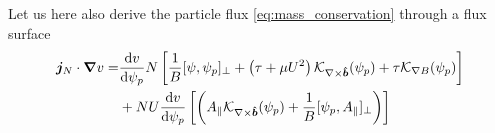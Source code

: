 Let us here also derive the particle flux \eqref{eq:mass_conservation} through a flux surface
\begin{align} \label{eq:particle_flux}
 \vec j_{N}\cdot \vec \nabla v %
 =&
  \frac{\d v}{\d \psi_p} N\left[\frac{1}{B}[\psi, \psi_p]_\perp + \left(\tau + \mu U^2\right)
   \mathcal K_{\nabla\times\bhat}(\psi_p) + \tau  \mathcal K_{\nabla B}(\psi_p) \right] \nonumber\\
 &+ NU\frac{\d v}{\d \psi_p}\left [\left( A_\parallel \mathcal
 K_{\nabla\times\bhat}(\psi_p) + \frac{1}{B}[\psi_p, A_\parallel]_\perp\right) \right] \\
\end{align}


